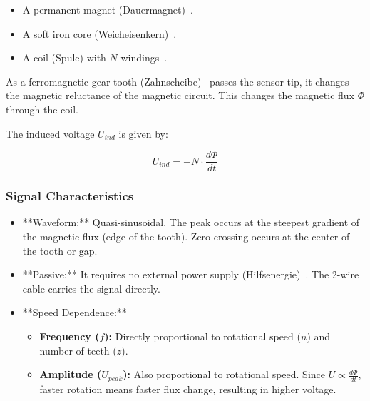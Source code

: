 \documentclass[a4paper,12pt]{article}
\begin{document}
\begin{itemize}

    \item A permanent magnet (Dauermagnet)~\cite{ref13}.

    \item A soft iron core (Weicheisenkern)~\cite{ref16}.

    \item A coil (Spule) with $N$ windings~\cite{ref17}.

\end{itemize}



As a ferromagnetic gear tooth (Zahnscheibe)~\cite{ref19} passes the sensor tip, it changes the magnetic reluctance of the magnetic circuit. This changes the magnetic flux $\Phi$ through the coil.



The induced voltage $U_{ind}$ is given by:

\begin{equation}

    U_{ind} = -N \cdot \frac{d\Phi}{dt}

\end{equation}



\subsubsection{Signal Characteristics}

\begin{itemize}

    \item **Waveform:** Quasi-sinusoidal. The peak occurs at the steepest gradient of the magnetic flux (edge of the tooth). Zero-crossing occurs at the center of the tooth or gap.

    \item **Passive:** It requires no external power supply (Hilfsenergie)~\cite{ref5}. The 2-wire cable carries the signal directly.

    \item **Speed Dependence:**

    \begin{itemize}

        \item \textbf{Frequency ($f$):} Directly proportional to rotational speed ($n$) and number of teeth ($z$).

        \item \textbf{Amplitude ($U_{peak}$):} Also proportional to rotational speed. Since $U \propto \frac{d\Phi}{dt}$, faster rotation means faster flux change, resulting in higher voltage.

    \end{itemize}

\end{itemize}
\end{document}
